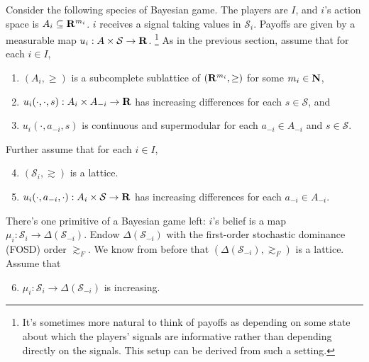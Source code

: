 \documentclass[11pt,letterpaper,reqno,oneside]{article}
\begin{document}
Consider the following species of Bayesian game. The players are $I$, and $i$'s action space is $A_i \subseteq \mathbf{R}^{m_i}$. $i$ receives a signal taking values in $\mathcal{S}_i$. Payoffs are given by a measurable map $u_i : A \times \mathcal{S} \to \mathbf{R}$.%
	\footnote{It's sometimes more natural to think of payoffs as depending on some state about which the players' signals are informative rather than depending directly on the signals. This setup can be derived from such a setting.} As in the previous section, assume that for each $i \in I$,
%
\begin{enumerate}

	\item $(A_i,\geq)$ is a subcomplete sublattice of $\left(\mathbf{R}^{m_i},\geq\right)$ for some $m_i \in \mathbf{N}$,

	\item $u_i(\cdot,\cdot,s) : A_i \times A_{-i} \to \mathbf{R}$ has increasing differences for each $s \in \mathcal{S}$, and

	\item $u_i(\cdot,a_{-i},s)$ is continuous and supermodular for each $a_{-i} \in A_{-i}$ and $s \in \mathcal{S}$.

\end{enumerate}
%
Further assume that for each $i \in I$,
%
\begin{enumerate}
	
	\setcounter{enumi}{3}

	\item $(\mathcal{S}_i,\gtrsim)$ is a lattice.

	\item $u_i(\cdot,a_{-i},\cdot) : A_i \times \mathcal{S} \to \mathbf{R}$ has increasing differences for each $a_{-i} \in A_{-i}$. 

\end{enumerate}

There's one primitive of a Bayesian game left: $i$'s belief is a map $\mu_i : \mathcal{S}_i \to \Delta( \mathcal{S}_{-i} )$. Endow $\Delta( \mathcal{S}_{-i} )$ with the first-order stochastic dominance (FOSD) order $\gtrsim_F$. We know from before that $\left( \Delta( \mathcal{S}_{-i} ), \gtrsim_F \right)$ is a lattice. Assume that
%
\begin{enumerate}
	
	\setcounter{enumi}{5}

	\item $\mu_i : \mathcal{S}_i \to \Delta( \mathcal{S}_{-i} )$ is increasing.

\end{enumerate}
\end{document}
